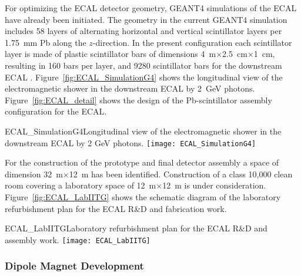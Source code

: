 For optimizing the ECAL detector geometry, %
GEANT4
simulations of the ECAL have already been initiated. The geometry in
the current GEANT4 simulation includes 58 layers of alternating
horizontal and vertical scintillator layers per 1.75~mm Pb along the
$z$-direction. In
the present configuration each scintillator layer is made of plastic scintillator
bars of dimensions 4~m$\times$2.5~cm$\times$1~cm, resulting in 160
bars per layer, and \num{9280} scintillator bars for the downstream ECAL .  
Figure~\ref{fig:ECAL_SimulationG4} shows
the longitudinal view of the electromagnetic shower in the downstream
ECAL by 2~GeV photons. Figure~\ref{fig:ECAL_detail} shows the design
of the Pb-scintillator assembly configuration for the ECAL.
\begin{cdrfigure}
{ECAL_SimulationG4}{Longitudinal view of the electromagnetic shower in
the downstream ECAL by 2 GeV photons.}
\texttt{[image: ECAL\_SimulationG4]}
\end{cdrfigure}

For the construction of the prototype and final detector assembly   a
space of dimension 32~m$\times$12~m has been
identified. Construction of a class 10,000 clean room covering a
laboratory space of 12~m$\times$12~m is under consideration. %
Figure~\ref{fig:ECAL_LabIITG} shows the schematic diagram
of the laboratory refurbishment plan for the ECAL R\&D and fabrication
work.
\begin{cdrfigure}
{ECAL_LabIITG}{Laboratory refurbishment plan for the ECAL R\&D and assembly work.}
\texttt{[image: ECAL\_LabIITG]}
\end{cdrfigure}


\subsubsection{Dipole Magnet Development}

